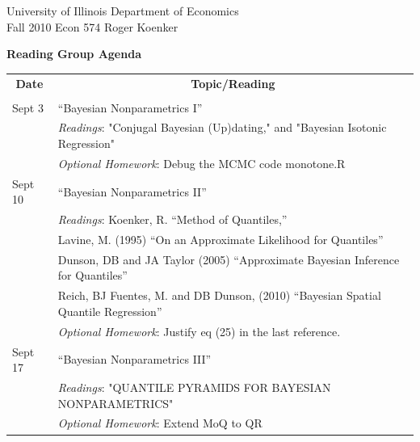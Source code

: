 \documentclass[11pt]{amsart}
\begin{document}
\noindent
University of Illinois \hfill Department of Economics \\
Fall 2010 \hfill Econ 574 \hfill Roger Koenker

\begin{center}
\large{
{\bf Reading Group Agenda }}
\end{center}

\vspace{5mm}
\begin{tabular}{ll}
\multicolumn{1}{c}{\bf Date} &  \multicolumn{1}{c}{\bf Topic/Reading} \\
 &  \\
Sept 3 & ``Bayesian Nonparametrics I''\\
& {\it Readings}: "Conjugal Bayesian (Up)dating," and "Bayesian Isotonic Regression" \\
& {\it Optional Homework}:  Debug the MCMC code monotone.R\\
Sept 10 & ``Bayesian Nonparametrics II''\\
& {\it Readings}:  Koenker, R.  ``Method of Quantiles,''\\
& Lavine, M. (1995) ``On an Approximate Likelihood for Quantiles'' \\ 
& Dunson, DB and JA Taylor (2005) ``Approximate Bayesian Inference for Quantiles'' \\
& Reich, BJ Fuentes, M. and DB Dunson, (2010) ``Bayesian Spatial Quantile Regression''\\
& {\it Optional Homework}:  Justify eq (25) in the last reference.\\
Sept 17 & ``Bayesian Nonparametrics III''\\
& {\it Readings}: "QUANTILE PYRAMIDS FOR BAYESIAN NONPARAMETRICS"\\
& {\it Optional Homework}:  Extend MoQ to QR \\
\end{tabular}
\end{document}
